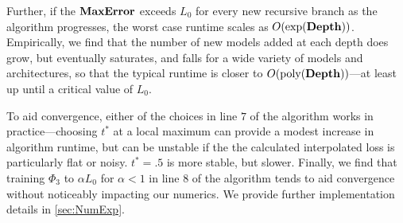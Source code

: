   Further, if the $\rm{\mathbf{MaxError}}$ exceeds $L_0$ for every new recursive branch as the algorithm progresses, the worst case runtime scales as $O(\rm{exp}(\rm{\mathbf{Depth}}))$.  Empirically, we find that the number of new models added at each depth does grow, but eventually saturates, and falls for a wide variety of models and architectures, so that the typical runtime is closer to $O(\rm{poly}(\rm{\mathbf{Depth}}))$---at least up until a critical value of $L_0$.
  
  To aid convergence, either of the choices in line $7$ of the algorithm works in practice---choosing $t^*$ at a local maximum can provide a modest increase in algorithm runtime, but can be unstable if the the calculated interpolated loss is particularly flat or noisy.  $t^*=.5$ is more stable, but slower.  Finally, we find that training $\Phi_3$ to $\alpha L_0$ for $\alpha < 1$ in line $8$ of the algorithm tends to aid convergence without noticeably impacting our numerics.  We provide further implementation details in \ref{sec:NumExp}.
 
